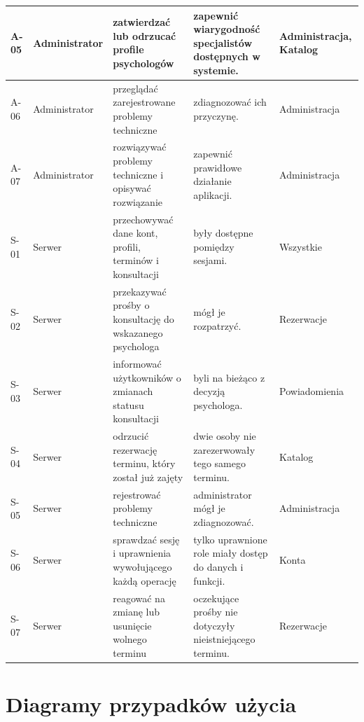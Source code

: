 \documentclass[11pt,a4paper]{article}
\begin{document}
\begin{xltabular}{\textwidth}{|p{1.1cm}|p{2.2cm}|Y|Y|p{2.4cm}|}
A-05 &
Administrator &
zatwierdzać lub odrzucać profile psychologów &
zapewnić wiarygodność specjalistów
dostępnych w systemie. &
Administracja, Katalog \\
\hline
 
A-06 &
Administrator &
przeglądać zarejestrowane problemy techniczne &
zdiagnozować ich przyczynę. &
Administracja \\
\hline
 
A-07 &
Administrator &
rozwiązywać problemy techniczne
i opisywać rozwiązanie &
zapewnić prawidłowe działanie aplikacji. &
Administracja \\
 
 
S-01 &
Serwer &
przechowywać dane kont, profili,
terminów i konsultacji &
były dostępne pomiędzy sesjami. &
Wszystkie \\
\hline
 
S-02 &
Serwer &
przekazywać prośby o konsultację
do wskazanego psychologa &
mógł je rozpatrzyć. &
Rezerwacje \\
\hline
 
S-03 &
Serwer &
informować użytkowników o zmianach
statusu konsultacji &
byli na bieżąco z decyzją psychologa. &
Powiadomienia \\
\hline
 
S-04 &
Serwer &
odrzucić rezerwację terminu,
który został już zajęty &
dwie osoby nie zarezerwowały
tego samego terminu. &
Katalog \\
\hline
 
S-05 &
Serwer &
rejestrować problemy techniczne &
administrator mógł je zdiagnozować. &
Administracja \\
\hline
 
S-06 &
Serwer &
sprawdzać sesję i uprawnienia
wywołującego każdą operację &
tylko uprawnione role miały dostęp
do danych i funkcji. &
Konta \\
\hline
 
S-07 &
Serwer &
reagować na zmianę lub usunięcie
wolnego terminu &
oczekujące prośby nie dotyczyły
nieistniejącego terminu. &
Rezerwacje \\
\hline
 
\end{xltabular}
\normalsize

\section*{Diagramy przypadków użycia}
\end{document}

